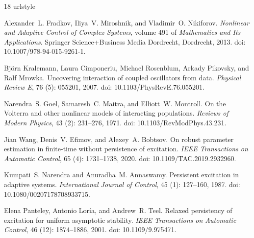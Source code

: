 \documentclass[11pt]{article}
\theoremstyle{thmstyleone}
\theoremstyle{thmstyletwo}
\theoremstyle{thmstylethree}
\begin{document}
\begin{thebibliography}{18}
\providecommand{\natexlab}[1]{#1}
\providecommand{\url}[1]{\texttt{#1}}
\expandafter\ifx\csname urlstyle\endcsname\relax
  \providecommand{\doi}[1]{doi: #1}\else
  \providecommand{\doi}{doi: \begingroup \urlstyle{rm}\Url}\fi

Alexander~L. Fradkov, Iliya~V. Miroshnik, and Vladimir~O. Nikiforov.
\newblock \emph{Nonlinear and Adaptive Control of Complex Systems}, volume 491 of \emph{Mathematics and Its Applications}.
\newblock Springer Science+Business Media Dordrecht, Dordrecht, 2013.
\newblock \doi{10.1007/978-94-015-9261-1}.

Bj{\"o}rn Kralemann, Laura Cimponeriu, Michael Rosenblum, Arkady Pikovsky, and Ralf Mrowka.
\newblock Uncovering interaction of coupled oscillators from data.
\newblock \emph{Physical Review E}, 76 (5): 055201, 2007.
\newblock \doi{10.1103/PhysRevE.76.055201}.

Narendra~S. Goel, Samaresh~C. Maitra, and Elliott~W. Montroll.
\newblock On the {Volterra} and other nonlinear models of interacting populations.
\newblock \emph{Reviews of Modern Physics}, 43 (2): 231--276, 1971.
\newblock \doi{10.1103/RevModPhys.43.231}.

Jian Wang, Denis~V. Efimov, and Alexey~A. Bobtsov.
\newblock On robust parameter estimation in finite-time without persistence of excitation.
\newblock \emph{IEEE Transactions on Automatic Control}, 65 (4): 1731--1738, 2020.
\newblock \doi{10.1109/TAC.2019.2932960}.

Kumpati~S. Narendra and Anuradha~M. Annaswamy.
\newblock Persistent excitation in adaptive systems.
\newblock \emph{International Journal of Control}, 45 (1): 127--160, 1987.
\newblock \doi{10.1080/00207178708933715}.

Elena Panteley, Antonio Lor{\'i}a, and Andrew~R. Teel.
\newblock Relaxed persistency of excitation for uniform asymptotic stability.
\newblock \emph{IEEE Transactions on Automatic Control}, 46 (12): 1874--1886, 2001.
\newblock \doi{10.1109/9.975471}.


\end{thebibliography}
\end{document}
